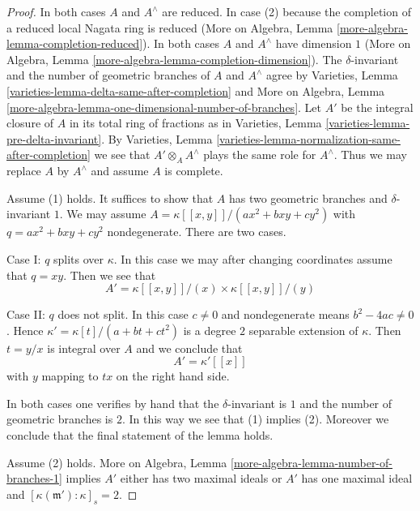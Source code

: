\begin{proof}
In both cases $A$ and $A^\wedge$ are reduced. In case (2)
because the completion of a reduced local Nagata ring is reduced
(More on Algebra, Lemma \ref{more-algebra-lemma-completion-reduced}).
In both cases $A$ and $A^\wedge$ have dimension $1$
(More on Algebra, Lemma \ref{more-algebra-lemma-completion-dimension}).
The $\delta$-invariant and the number of geometric branches of
$A$ and $A^\wedge$ agree by
Varieties, Lemma \ref{varieties-lemma-delta-same-after-completion}
and
More on Algebra, Lemma
\ref{more-algebra-lemma-one-dimensional-number-of-branches}.
Let $A'$ be the integral closure of $A$ in its total ring of fractions
as in Varieties, Lemma \ref{varieties-lemma-pre-delta-invariant}.
By Varieties, Lemma \ref{varieties-lemma-normalization-same-after-completion}
we see that $A' \otimes_A A^\wedge$ plays the same role for $A^\wedge$.
Thus we may replace $A$ by $A^\wedge$ and assume $A$ is complete.

\medskip\noindent
Assume (1) holds. It suffices to show that $A$ has two
geometric branches and $\delta$-invariant $1$.
We may assume $A = \kappa[[x, y]]/(ax^2 + bxy + cy^2)$ with
$q = ax^2 + bxy + cy^2$ nondegenerate. There are two cases.

\medskip\noindent
Case I: $q$ splits over $\kappa$. In this case we may after
changing coordinates assume that $q = xy$. Then we see that
$$
A' = \kappa[[x, y]]/(x) \times \kappa[[x, y]]/(y)
$$

\medskip\noindent
Case II: $q$ does not split. In this case $c \not = 0$ and
nondegenerate means $b^2 - 4ac \not = 0$. Hence
$\kappa' = \kappa[t]/(a + bt + ct^2)$ is a degree $2$
separable extension of $\kappa$. Then $t = y/x$
is integral over $A$ and we conclude that
$$
A' = \kappa'[[x]]
$$
with $y$ mapping to $tx$ on the right hand side.

\medskip\noindent
In both cases one verifies by hand that the $\delta$-invariant
is $1$ and the number of geometric branches is $2$. In
this way we see that (1) implies (2).
Moreover we conclude that the final statement of the lemma holds.

\medskip\noindent
Assume (2) holds.
More on Algebra, Lemma \ref{more-algebra-lemma-number-of-branches-1}
implies $A'$ either has two maximal ideals or $A'$ has one maximal ideal
and $[\kappa(\mathfrak m') : \kappa]_s = 2$.


\end{proof}
